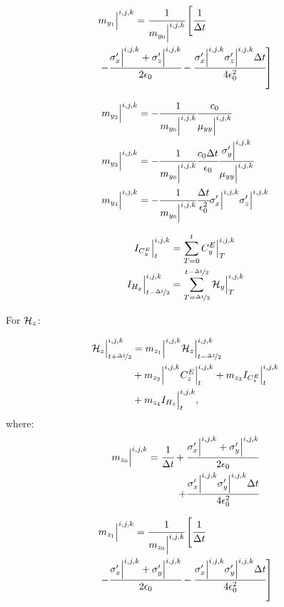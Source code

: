 \begin{align}
    &m_{{y_1}}\Big|^{i,j,k} = \cfrac{1}{m_{{y_0}}\Big|^{i,j,k}}\left[\cfrac{1}{\Delta t} \right. 
    \nonumber \\
    &\left.- \cfrac{\sigma_x^{\prime}\Big|^{i,j,k} + \sigma_z^{\prime}\Big|^{i,j,k}}{2\epsilon_0} - \cfrac{\sigma_x^{\prime}\Big|^{i,j,k}  \sigma_z^{\prime}\Big|^{i,j,k} \Delta t}{4\epsilon_0^2} \right]
\end{align}

\begin{align}
    m_{{y_2}}\Big|^{i,j,k} &= -\cfrac{1}{m_{{y_0}}\Big|^{i,j,k}} \cfrac{c_0}{\mu_{yy}\Big|^{i,j,k}}
    \\
    m_{{y_3}}\Big|^{i,j,k} &= -\cfrac{1}{m_{{y_0}}\Big|^{i,j,k}} \cfrac{c_0\Delta t}{\epsilon_0 }\cfrac{ \sigma_y^{\prime}\Big|^{i,j,k}}{\mu_{yy}\Big|^{i,j,k}}
    \\
    m_{{y_4}}\Big|^{i,j,k} &= -\cfrac{1}{m_{{y_0}}\Big|^{i,j,k}} \cfrac{\Delta t}{\epsilon_0^2} \sigma_x^{\prime}\Big|^{i,j,k}  \sigma_z^{\prime}\Big|^{i,j,k}
\end{align}

\begin{align}
    I_{C^E_y}\Big|^{i,j,k}_t &= \sum\limits_{T=0}^tC_y^E\Big|^{i,j,k}_T
    \\
    I_{H_y}\Big|^{i,j,k}_{t-\nicefrac{\Delta t}{2}} &= \sum\limits_{T=\nicefrac{\Delta t}{2}}^{t-\nicefrac{\Delta t}{2}} \mathcal{H}_y\Big|^{i,j,k}_T
\end{align}

For $\mathcal{H}_z$:

\begin{align}
    \mathcal{H}_z\Big|_{t+\nicefrac{\Delta t}{2}}^{i,j,k} &= m_{{z_1}}\Big|^{i,j,k} \mathcal{H}_z\Big|_{t-\nicefrac{\Delta t}{2}}^{i,j,k} 
    \nonumber \\
    & + m_{{z_2}}\Big|^{i,j,k}C_z^E\Big|^{i,j,k}_{t} + m_{{z_3}} I_{C^E_z}\Big|^{i,j,k}_{t} 
    \nonumber \\
    &+ m_{{z_4}} I_{H_z}\Big|^{i,j,k}_{t},
\end{align}
where:
\begin{align}
    m_{{z_0}}\Big|^{i,j,k} = \cfrac{1}{\Delta t} + \cfrac{\sigma_x^{\prime}\Big|^{i,j,k} + \sigma_y^{\prime}\Big|^{i,j,k}}{2\epsilon_0} \nonumber\\ + \cfrac{\sigma_x^{\prime}\Big|^{i,j,k}  \sigma_y^{\prime}\Big|^{i,j,k} \Delta t}{4\epsilon_0^2}
\end{align}

\begin{align}
    &m_{{z_1}}\Big|^{i,j,k} = \cfrac{1}{m_{{z_0}}\Big|^{i,j,k}}\left[\cfrac{1}{\Delta t} \right. 
    \nonumber \\
    &\left.- \cfrac{\sigma_x^{\prime}\Big|^{i,j,k} + \sigma_y^{\prime}\Big|^{i,j,k}}{2\epsilon_0} - \cfrac{\sigma_x^{\prime}\Big|^{i,j,k}  \sigma_y^{\prime}\Big|^{i,j,k} \Delta t}{4\epsilon_0^2} \right]
\end{align}


